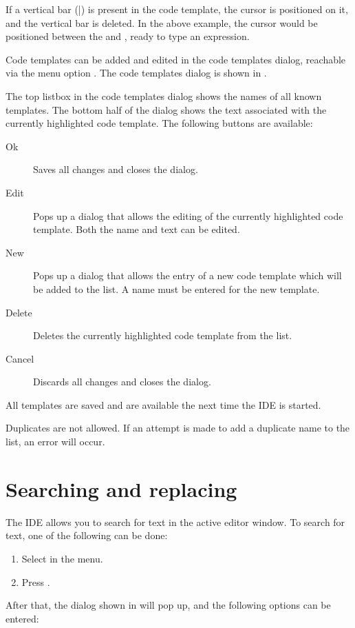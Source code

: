 If a vertical bar (|) is present in the code template, the cursor is positioned
on it, and the vertical bar is deleted. In the above example, the cursor would be
positioned between the  and , ready to type an expression.

Code templates can be added and edited in the code templates dialog, reachable via
the menu option .
The code templates dialog is shown in .


The top listbox in the code templates dialog shows the names of all
known templates. The bottom half of the dialog shows the text associated
with the currently highlighted code template.
The following buttons are available:
\begin{description}
\item[Ok] Saves all changes and closes the dialog.
\item[Edit] Pops up a dialog that allows the editing of the currently
highlighted code template. Both the name and text can be edited.
\item[New] Pops up a dialog that allows the entry of a new code template
which will be added to the list. A name must be entered for the new
template.
\item[Delete] Deletes the currently highlighted code template from the list.
\item[Cancel] Discards all changes and closes the dialog.
\end{description}
All templates are saved and are available the next time the IDE is started.
\begin{remark}
Duplicates are not allowed. If an attempt is made to add a duplicate name
to the list, an error will occur.
\end{remark}

\section{Searching and replacing}
\label{se:searching}
The IDE allows you to search for text in the active editor window.
To search for text, one of the following can be done:
\begin{enumerate}
\item Select  in the menu.
\item Press .
\end{enumerate}
After that, the dialog shown in  will pop up,
and the following options can be entered:

